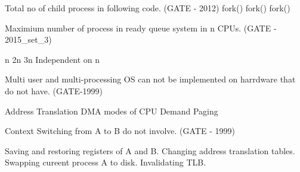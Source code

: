 
\begin{minipage}{\linewidth}

  \question  Total no of child process in following code. (GATE - 2012) \newline
    fork()  \newline fork()  \newline  fork()

  \begin{oneparchoices}
  \end{oneparchoices}

\end{minipage}



\begin{minipage}{\linewidth}

  \question Maximium number of process in ready queue system in n CPUs. (GATE - 2015\_set\_3)

  \begin{oneparchoices}
    \choice n
    \choice 2n
    \choice 3n
    \choice Independent on n
  \end{oneparchoices}

\end{minipage}



\begin{minipage}{\linewidth}

  \question  Multi user and multi-processing OS can not be implemented on harrdware that do not have. (GATE-1999)

  \begin{choices}
    \choice Address Translation
    \choice DMA
     modes of CPU
    \choice Demand Paging
  \end{choices}

\end{minipage}



\begin{minipage}{\linewidth}

  \question  Context Switching from A to B do not involve. (GATE - 1999)

  \begin{choices}
    \choice Saving and restoring registers of A and B.
    \choice Changing address translation tables.
    \choice Swapping cureent process A to disk.
    \choice Invalidating TLB.
  \end{choices}

\end{minipage}

